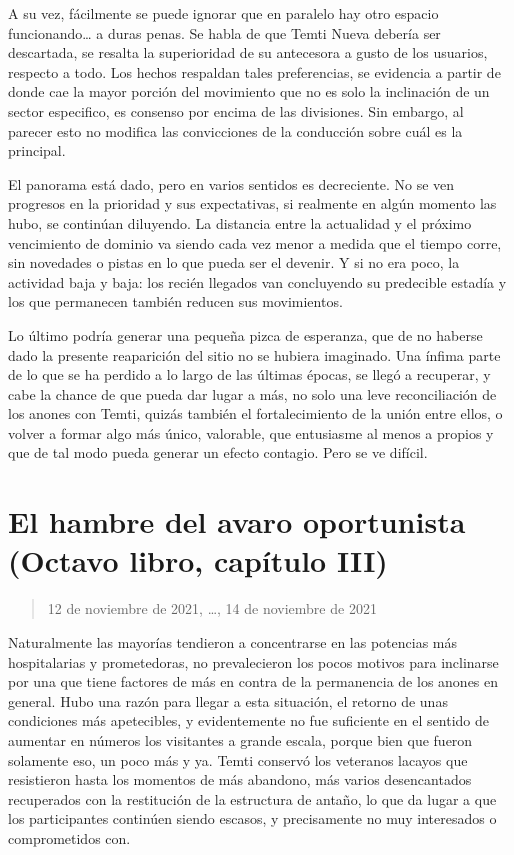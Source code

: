 \documentclass[
  spanish,
]{book}
\begin{document}
A su vez, fácilmente se puede ignorar que en paralelo hay otro espacio funcionando\ldots{} a duras penas. Se habla de que Temti Nueva debería ser descartada, se resalta la superioridad de su antecesora a gusto de los usuarios, respecto a todo. Los hechos respaldan tales preferencias, se evidencia a partir de donde cae la mayor porción del movimiento que no es solo la inclinación de un sector especifico, es consenso por encima de las divisiones. Sin embargo, al parecer esto no modifica las convicciones de la conducción sobre cuál es la principal.

El panorama está dado, pero en varios sentidos es decreciente. No se ven progresos en la prioridad y sus expectativas, si realmente en algún momento las hubo, se continúan diluyendo. La distancia entre la actualidad y el próximo vencimiento de dominio va siendo cada vez menor a medida que el tiempo corre, sin novedades o pistas en lo que pueda ser el devenir. Y si no era poco, la actividad baja y baja: los recién llegados van concluyendo su predecible estadía y los que permanecen también reducen sus movimientos.

Lo último podría generar una pequeña pizca de esperanza, que de no haberse dado la presente reaparición del sitio no se hubiera imaginado. Una ínfima parte de lo que se ha perdido a lo largo de las últimas épocas, se llegó a recuperar, y cabe la chance de que pueda dar lugar a más, no solo una leve reconciliación de los anones con Temti, quizás también el fortalecimiento de la unión entre ellos, o volver a formar algo más único, valorable, que entusiasme al menos a propios y que de tal modo pueda generar un efecto contagio. Pero se ve difícil.

\hypertarget{el-hambre-del-avaro-oportunista-octavo-libro-capuxedtulo-iii}{%
\section{El hambre del avaro oportunista (Octavo libro, capítulo III)}\label{el-hambre-del-avaro-oportunista-octavo-libro-capuxedtulo-iii}}

\begin{quote}
12 de noviembre de 2021, \ldots, 14 de noviembre de 2021
\end{quote}

Naturalmente las mayorías tendieron a concentrarse en las potencias más hospitalarias y prometedoras, no prevalecieron los pocos motivos para inclinarse por una que tiene factores de más en contra de la permanencia de los anones en general. Hubo una razón para llegar a esta situación, el retorno de unas condiciones más apetecibles, y evidentemente no fue suficiente en el sentido de aumentar en números los visitantes a grande escala, porque bien que fueron solamente eso, un poco más y ya. Temti conservó los veteranos lacayos que resistieron hasta los momentos de más abandono, más varios desencantados recuperados con la restitución de la estructura de antaño, lo que da lugar a que los participantes continúen siendo escasos, y precisamente no muy interesados o comprometidos con.
\end{document}
